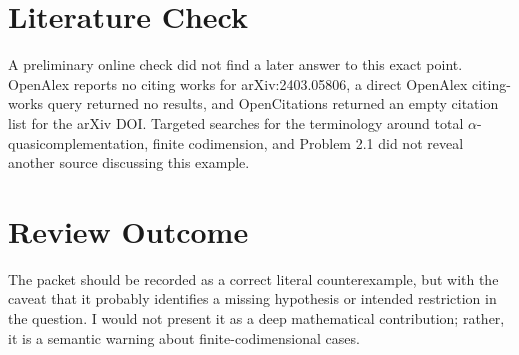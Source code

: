 \documentclass[11pt]{article}
\begin{document}
\section*{Literature Check}

A preliminary online check did not find a later answer to this exact point.
OpenAlex reports no citing works for arXiv:2403.05806, a direct OpenAlex
citing-works query returned no results, and OpenCitations returned an empty
citation list for the arXiv DOI.  Targeted searches for the terminology
around total \(\alpha\)-quasicomplementation, finite codimension, and
Problem 2.1 did not reveal another source discussing this example.

\section*{Review Outcome}

The packet should be recorded as a correct literal counterexample, but with
the caveat that it probably identifies a missing hypothesis or intended
restriction in the question.  I would not present it as a deep mathematical
contribution; rather, it is a semantic warning about finite-codimensional
cases.
\end{document}
